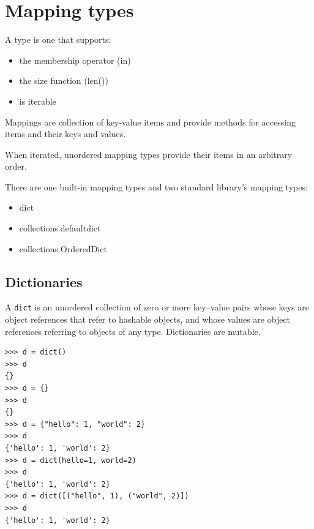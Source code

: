 \section{Mapping types}

\begin{tcolorbox}
A  type is one that supports:
\begin{itemize}
\item the membership operator (in)
\item the size function (len())
\item is iterable 
\end{itemize}

Mappings are collection of key-value items and provide methods for accessing items and their keys and values.
\end{tcolorbox}

When iterated, unordered mapping types provide their items in an arbitrary order.


There are one built-in mapping types and two standard library's mapping types:
\begin{itemize}
\item dict
\item collections.defaultdict
\item collections.OrderedDict
\end{itemize}



\subsection{Dictionaries}

A \verb|dict| is an unordered collection of zero or more key–value pairs whose keys are object references that refer to hashable objects, and whose values are object references referring to objects of any type.
Dictionaries are mutable.

\begin{lstlisting}
>>> d = dict()
>>> d
{}
>>> d = {}
>>> d
{}
>>> d = {"hello": 1, "world": 2}
>>> d
{'hello': 1, 'world': 2}
>>> d = dict(hello=1, world=2)
>>> d
{'hello': 1, 'world': 2}
>>> d = dict([("hello", 1), ("world", 2)])
>>> d
{'hello': 1, 'world': 2}  
\end{lstlisting}



